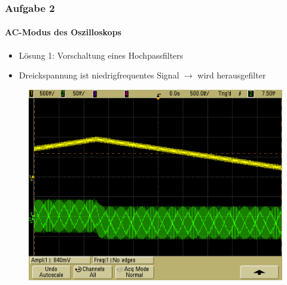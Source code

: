 \begin{frame}
\frametitle{Aufgabe 2}
\framesubtitle{AC-Modus des Oszilloskops}
\begin{itemize}
    \item Lösung 1: Vorschaltung eines Hochpassfilters
    \item Dreickspannung ist niedrigfrequentes Signal $\rightarrow$ wird herausgefilter
\end{itemize}
\begin{figure}[H]
    \begin{center}
            \includegraphics[scale=0.2]{./img/2c_Dreieck.png}
    \end{center}
\end{figure}
\end{frame}
